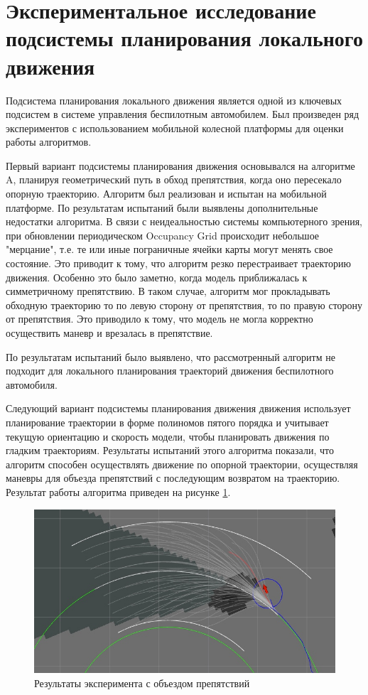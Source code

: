 \section{Экспериментальное исследование подсистемы планирования локального движения}

Подсистема планирования локального движения является одной из ключевых подсистем в системе управления беспилотным
автомобилем. Был произведен ряд экспериментов с использованием мобильной колесной платформы для оценки работы алгоритмов.

Первый вариант подсистемы планирования движения основывался на алгоритме A, планируя геометрический путь в обход
препятствия, когда оно пересекало опорную траекторию.
Алгоритм был реализован и испытан на мобильной платформе. По результатам испытаний были выявлены дополнительные
недостатки алгоритма. В связи с неидеальностью системы компьютерного зрения, при обновлении периодическом Occupancy Grid
происходит небольшое "мерцание", т.е. те или иные пограничные ячейки карты могут менять свое состояние. Это приводит
к тому, что алгоритм резко перестраивает траекторию движения. Особенно это было заметно, когда модель приближалась
к симметричному препятствию. В таком случае, алгоритм мог прокладывать обходную траекторию то по левую сторону от
препятствия, то по правую сторону от препятствия. Это приводило к тому, что модель не могла корректно осуществить
маневр и врезалась в препятствие.

По результатам испытаний было выявлено, что рассмотренный алгоритм не подходит для локального планирования траекторий
движения беспилотного автомобиля.

Следующий вариант подсистемы планирования движения движения использует планирование траектории в форме полиномов пятого
порядка и учитывает текущую ориентацию и скорость модели, чтобы планировать движения по гладким траекториям.
Результаты испытаний этого алгоритма показали, что алгоритм способен осуществлять движение по опорной траектории,
осуществляя маневры для объезда препятствий с последующим возвратом на траекторию. Результат работы алгоритма
приведен на рисунке \ref{img:obstacle_avoidance}.

\begin{figure}[h]
    \centering
    \includegraphics[width=\linewidth]{images/obstacle_avoidance}
    \caption{Результаты эксперимента с объездом препятствий}
    \label{img:obstacle_avoidance}
\end{figure}

